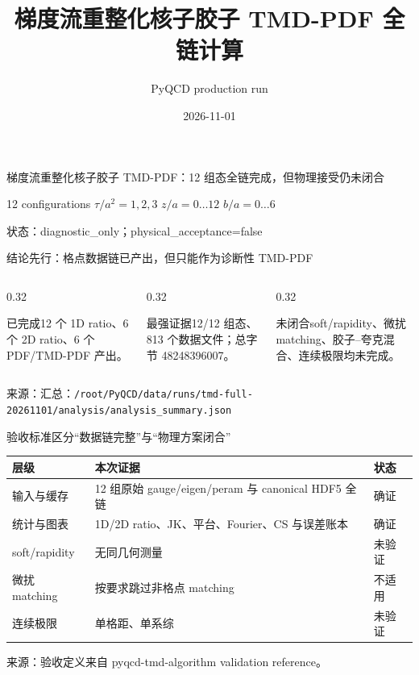 \documentclass[UTF8,aspectratio=169,11pt]{ctexbeamer}
\title[PyQCD TMD]{梯度流重整化核子胶子 TMD-PDF 全链计算}
\author[PyQCD]{PyQCD production run}
\date{2026-11-01}
\newcommand{\source}[1]{\vspace{0.06em}\par{\raggedright\scriptsize\color{muted}来源：#1\par}}
\begin{document}
\begin{frame}[plain]{梯度流重整化核子胶子 TMD-PDF：12 组态全链完成，但物理接受仍未闭合}
  \centering\begin{minipage}{0.86\linewidth}\par\vspace{0.7em}12 configurations \quad $\tau/a^2=1,2,3$ \quad $z/a=0\ldots12$ \quad $b/a=0\ldots6$\par\vspace{1em}\textcolor{warning}{状态：diagnostic\_only；physical\_acceptance=false}\end{minipage}

\end{frame}

\begin{frame}[t]{结论先行：格点数据链已产出，但只能作为诊断性 TMD-PDF}
  \begin{columns}[T,totalwidth=\textwidth]
\begin{column}{0.32\textwidth}\begin{block}{已完成}12 个 1D ratio、6 个 2D ratio、6 个 PDF/TMD-PDF 产出。\end{block}\end{column}
\begin{column}{0.32\textwidth}\begin{block}{最强证据}12/12 组态、813 个数据文件；总字节 48248396007。\end{block}\end{column}
\begin{column}{0.32\textwidth}\begin{block}{未闭合}soft/rapidity、微扰 matching、胶子--夸克混合、连续极限均未完成。\end{block}\end{column}\end{columns}

  \source{汇总：\nolinkurl{/root/PyQCD/data/runs/tmd-full-20261101/analysis/analysis_summary.json}}
\end{frame}

\begin{frame}[t]{验收标准区分“数据链完整”与“物理方案闭合”}
  \small\begin{tabularx}{\linewidth}{@{}l X l@{}}\toprule 层级 & 本次证据 & 状态 \\ \midrule 输入与缓存 & 12 组原始 gauge/eigen/peram 与 canonical HDF5 全链 & 确证 \\ 统计与图表 & 1D/2D ratio、JK、平台、Fourier、CS 与误差账本 & 确证 \\ soft/rapidity & 无同几何测量 & 未验证 \\ 微扰 matching & 按要求跳过非格点 matching & 不适用 \\ 连续极限 & 单格距、单系综 & 未验证 \\ \bottomrule\end{tabularx}

  \source{验收定义来自 pyqcd-tmd-algorithm validation reference。}
\end{frame}
\end{document}

